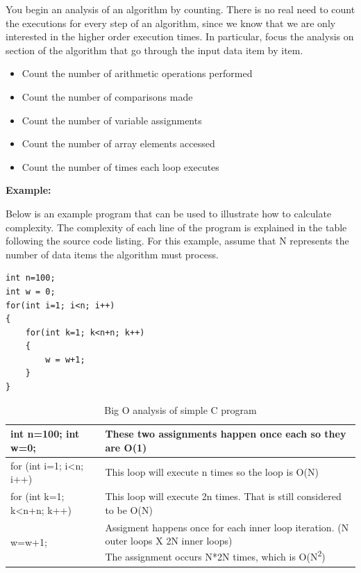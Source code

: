 You begin an analysis of an algorithm by counting.   There is no real need to count the executions for every step of an algorithm, since we know that we are only interested in the higher order execution times.   In particular,  focus the analysis on section of the algorithm that go through the input data item by item.  

\begin {itemize}
\item Count the number of arithmetic operations performed
\item Count the number of comparisons made
\item Count the number of variable assignments
\item Count the number of array elements accessed 
\item Count the number of times each loop executes
\end{itemize}



\textbf{Example:}

Below is an example program that can be used to illustrate how to
calculate complexity. The complexity of each line of the program is
explained in the table following the source code listing. For this example, assume that N represents the
number of data items the algorithm must process.

\begin{center}
\begin{lstlisting}
int n=100;
int w = 0;
for(int i=1; i<n; i++)
{
	for(int k=1; k<n+n; k++)
	{
		w = w+1;
	}
}
\end{lstlisting}

\begin{table}[h]
\caption{Big O analysis of simple C program}
\begin{tabular}{l || l}
int n=100; int w=0;& These two assignments happen once each so they are O(1)\\ \hline
for (int i=1; i\textless n; i++) & This loop will execute n times so the loop is O(N)\\\hline
for (int k=1; k\textless n+n; k++) & This loop will execute 2n times.  That is still considered to be O(N)\\\hline
{  w=w+1;} & \specialcell[]{Assigment happens once for each inner loop iteration. (N outer loops X 2N inner loops) \\The assignment occurs N*2N times, which is O(N\textsuperscript{2})}\\\hline\hline
\end{tabular}

\end{table}
\end{center}

